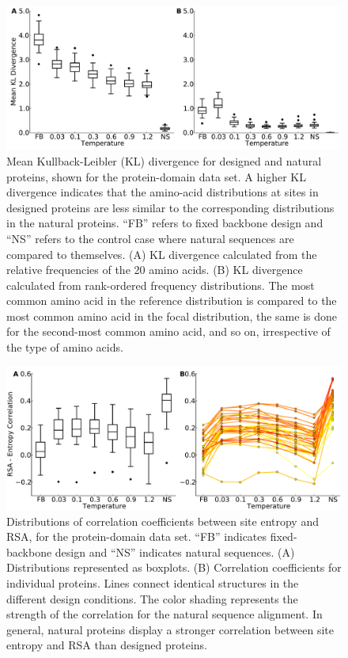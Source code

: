 \documentclass[12pt]{article}
\begin{document}
\begin{figure}[H]
\centerline{\includegraphics[width = 6in]{figures/Mean_KL_vs_Temp_Boxplot.pdf}}
\caption{Mean Kullback-Leibler (KL) divergence for designed and natural proteins, shown for the protein-domain data set. A higher KL divergence indicates that the amino-acid distributions at sites in designed proteins are less similar to the corresponding distributions in the natural proteins. ``FB'' refers to fixed backbone design and ``NS'' refers to the control case where natural sequences are compared to themselves. (A) KL divergence calculated from the relative frequencies of the 20 amino acids. (B) KL divergence calculated from rank-ordered frequency distributions. The most common amino acid in the reference distribution is compared to the most common amino acid in the focal distribution, the same is done for the second-most common amino acid, and so on, irrespective of the type of amino acids.}
\label{AADisFig1}
\end{figure}


\begin{figure}[H]
\centerline{\includegraphics[width = 6in]{figures/Cor_Mean_Entropy_RSA_Combination_Plot.pdf}}
\caption{Distributions of correlation coefficients between site entropy and RSA, for the protein-domain data set. ``FB'' indicates fixed-backbone design and ``NS'' indicates natural sequences. (A) Distributions represented as boxplots. (B) Correlation coefficients for individual proteins. Lines connect identical structures in the different design conditions. The color shading represents the strength of the correlation for the natural sequence alignment. In general, natural proteins display a stronger correlation between site entropy and RSA than designed proteins.}
\label{Correlation_figure}
\end{figure}
\end{document}
